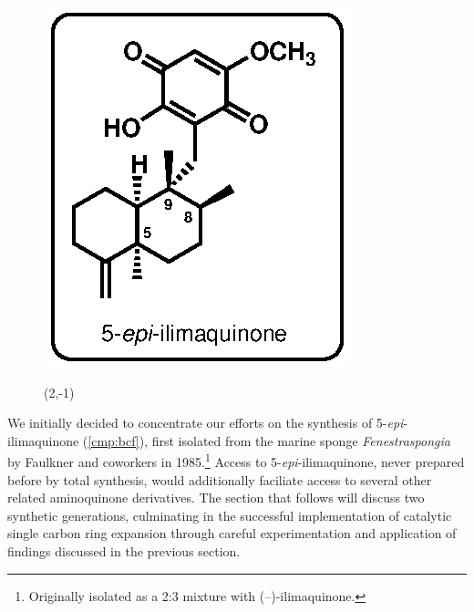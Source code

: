\begin{figure}
  \vspace{-25pt}
  \begin{center}
    \includegraphics[scale=0.8]{chp_singlecarbon/images/5epiilimaquinone}
    \begin{textblock}{1}(2,-1)  \end{textblock}
  \end{center}
  \vspace{-30pt}
\end{figure}
We initially decided to concentrate our efforts on the synthesis of
5-\textit{epi}-ilimaquinone (\ref{cmp:bcf}), first isolated from the marine
sponge \textit{Fenestraspongia} by Faulkner and coworkers in
1985.\footnote{Originally isolated as a 2:3 mixture with
(--)-ilimaquinone. } Access to
5-\textit{epi}-ilimaquinone, never prepared before by total synthesis, would
additionally faciliate access to several other related aminoquinone
derivatives. The section that follows
will discuss two synthetic generations, culminating in the successful
implementation of catalytic single carbon ring expansion through careful
experimentation and application of findings discussed in the previous section.

